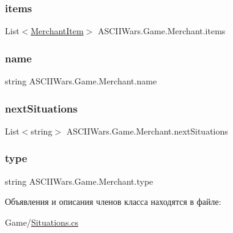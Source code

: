 \subsubsection{\texorpdfstring{items}{items}}
{\footnotesize\ttfamily List$<$\hyperlink{class_a_s_c_i_i_wars_1_1_game_1_1_merchant_item}{Merchant\+Item}$>$ A\+S\+C\+I\+I\+Wars.\+Game.\+Merchant.\+items}

\hypertarget{class_a_s_c_i_i_wars_1_1_game_1_1_merchant_ada225b0cd9c12c73b70729b821541d90}{}\label{class_a_s_c_i_i_wars_1_1_game_1_1_merchant_ada225b0cd9c12c73b70729b821541d90} 
\subsubsection{\texorpdfstring{name}{name}}
{\footnotesize\ttfamily string A\+S\+C\+I\+I\+Wars.\+Game.\+Merchant.\+name}

\hypertarget{class_a_s_c_i_i_wars_1_1_game_1_1_merchant_a882142ada4b87c08a3a6b9e1c895c7c0}{}\label{class_a_s_c_i_i_wars_1_1_game_1_1_merchant_a882142ada4b87c08a3a6b9e1c895c7c0} 
\subsubsection{\texorpdfstring{next\+Situations}{nextSituations}}
{\footnotesize\ttfamily List$<$string$>$ A\+S\+C\+I\+I\+Wars.\+Game.\+Merchant.\+next\+Situations}

\hypertarget{class_a_s_c_i_i_wars_1_1_game_1_1_merchant_a49fe8caa978e4dd0199f0b583f1c99a3}{}\label{class_a_s_c_i_i_wars_1_1_game_1_1_merchant_a49fe8caa978e4dd0199f0b583f1c99a3} 
\subsubsection{\texorpdfstring{type}{type}}
{\footnotesize\ttfamily string A\+S\+C\+I\+I\+Wars.\+Game.\+Merchant.\+type}



Объявления и описания членов класса находятся в файле\+:\begin{DoxyCompactItemize}
\item 
Game/\hyperlink{_situations_8cs}{Situations.\+cs}\end{DoxyCompactItemize}

